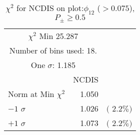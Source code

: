  \begin{table}[h!]\centering
 {\small{
 \begin{tabular}{||l||r||r||}
 \hline
 \hline
\multicolumn{2}{||c||}{$\chi^{2}$ Min  25.287} & \\
 \multicolumn{2}{||c||}{Number of bins used:   18.} & \\
\multicolumn{2}{||c||}{One $\sigma$:    1.185} & \\
 \hline
 \hline
    & NCDIS & \\
Norm at Min $\chi^{2}$  &   1.050 & \\
$-1$ $\sigma$ &   1.026  &  $($  2.2$\%)$  \\
$+1$ $\sigma$ &   1.073  &  $($  2.2$\%)$  \\
 \hline
 \hline
 \end{tabular}
 \caption{$\chi^{2}$ for NCDIS on plot:$\phi_{12}$ (\ztrz $> 0.075$), $P_\pm \geq 0.5$}
 \label{tab-chinc}
 }}
 \end{table}
 \endinput
